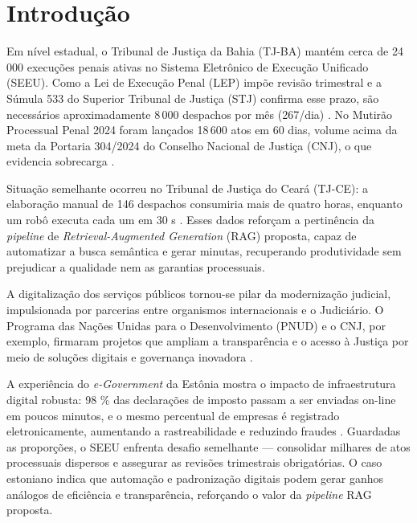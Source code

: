 
\chapter{Introdução}
\label{sec:introducao}

Em nível estadual, o Tribunal de Justiça da Bahia (TJ-BA) mantém cerca de
24\,000 execuções penais ativas no Sistema Eletrônico de Execução Unificado
(SEEU). Como a Lei de Execução Penal (LEP) impõe revisão trimestral e a
Súmula 533 do Superior Tribunal de Justiça (STJ) confirma esse prazo, são
necessários aproximadamente 8\,000 despachos por mês (267/dia)
\cite{brasil1984lep,stj2015sumula533}. No Mutirão Processual Penal 2024 foram
lançados 18\,600 atos em 60 dias, volume acima da meta da Portaria 304/2024 do
Conselho Nacional de Justiça (CNJ), o que evidencia sobrecarga
\cite{tjba2024mutirao,cnj2024portaria304}.

Situação semelhante ocorreu no Tribunal de Justiça do Ceará (TJ-CE): a elaboração
manual de 146 despachos consumiria mais de quatro horas, enquanto um robô
executa cada um em 30 s \cite{tjce2023robos}.  Esses dados reforçam a
pertinência da \emph{pipeline} de \emph{Retrieval-Augmented Generation} (RAG)
proposta, capaz de automatizar a busca semântica e gerar minutas, recuperando
produtividade sem prejudicar a qualidade nem as garantias processuais.

A digitalização dos serviços públicos tornou-se pilar da modernização judicial,
impulsionada por parcerias entre organismos internacionais e o Judiciário.  O
Programa das Nações Unidas para o Desenvolvimento (PNUD) e o CNJ, por exemplo,
firmaram projetos que ampliam a transparência e o acesso à Justiça por meio de
soluções digitais e governança inovadora \cite{undp2025pnudcnj}.

A experiência do \emph{e-Government} da Estônia mostra o impacto de
infraestrutura digital robusta: 98 \% das declarações de imposto passam a ser
enviadas on-line em poucos minutos, e o mesmo percentual de empresas é
registrado eletronicamente, aumentando a rastreabilidade e reduzindo fraudes
\cite{divald2021eformalization}. Guardadas as proporções, o SEEU enfrenta
desafio semelhante — consolidar milhares de atos processuais dispersos e
assegurar as revisões trimestrais obrigatórias. O caso estoniano indica que
automação e padronização digitais podem gerar ganhos análogos de eficiência e
transparência, reforçando o valor da \emph{pipeline} RAG proposta.

